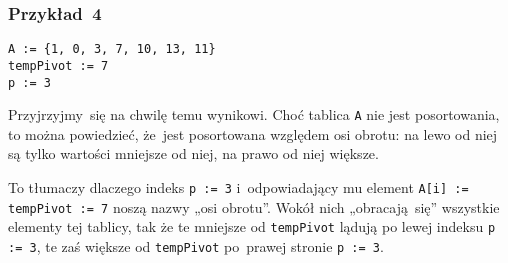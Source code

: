 \documentclass[10pt,t]{beamer}
\begin{document}
\begin{frame}
  \frametitle{Przykład~4}


  \texttt{A := \{1, 0, 3, 7, 10, 13, 11\}} \\
  \texttt{tempPivot := 7} \\
  \texttt{p := 3}

  Przyjrzyjmy~się na chwilę temu wynikowi. Choć tablica \texttt{A}
  nie jest posortowania, to można powiedzieć, że~jest posortowana
  \alert{względem} osi obrotu: na lewo od niej są tylko wartości mniejsze
  od niej, na prawo od niej większe.

  To tłumaczy dlaczego indeks \texttt{p := 3} i~odpowiadający mu element
  \texttt{A[i] := tempPivot := 7} noszą nazwy „osi obrotu”.
  Wokół nich „obracają~się” wszystkie elementy tej tablicy, tak że te
  mniejsze od \texttt{tempPivot} lądują po lewej indeksu \texttt{p := 3},
  te zaś większe od \texttt{tempPivot} po~prawej stronie \texttt{p := 3}.








\end{frame}
\end{document}
